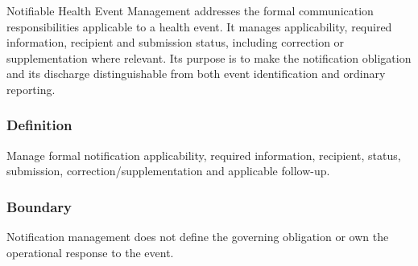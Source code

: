 Notifiable Health Event Management addresses the formal communication responsibilities applicable to a health event. It manages applicability, required information, recipient and submission status, including correction or supplementation where relevant. Its purpose is to make the notification obligation and its discharge distinguishable from both event identification and ordinary reporting.

\subsubsection*{Definition}

Manage formal notification applicability, required information, recipient, status, submission, correction/\allowbreak{}supplementation and applicable follow-up.

\subsubsection*{Boundary}

Notification management does not define the governing obligation or own the operational response to the event.

